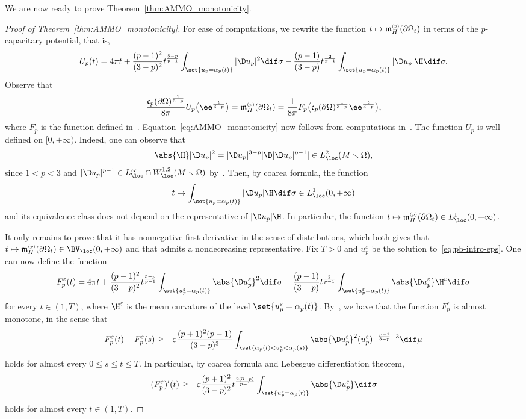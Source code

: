 \documentclass[10pt,a4paper]{amsart}
\numberwithin{equation}{section}
\renewcommand{\ncapa}{\mathfrak{c}}
\newcommand{\ma}{\mathfrak{m}}
\newcommand{\tp}[1][p]{{\text{\tiny$(#1)$}}}
\begin{document}
We are now ready to prove Theorem~\ref{thm:AMMO_monotonicity}.

\begin{proof}[Proof of Theorem~\ref{thm:AMMO_monotonicity}] For ease of computations, we rewrite the function $t\mapsto \ma_{H}^{\tp}(\partial \Omega_t)$ in terms of the $p$-capacitary potential, that is,
\[
 U_p(t)= 4 \pi t + \frac{(p-1)^2}{(3-p)^2} t^{\frac{5-p}{p-1}} \int_{\set{u_p = \alpha_p(t)}} | \D u_p |^2 \dif \sigma -\frac{(p-1)}{(3-p)} t^{\frac{2}{p-1}} \int_{\set{u_p = \alpha_p(t)}} | \D u_p |\H \dif \sigma.
\]
Observe that
\[
 \frac{\ncapa_p(\partial \Omega)^\frac{1}{3-p}}{8\pi} U_p\big(\ee^{\frac{t}{3-p}}\big) = \ma_{H}^{\tp}(\partial \Omega_t)= \frac{1}{8\pi}F_p\big(\ncapa_p(\partial \Omega)^\frac{1}{3-p} \ee^{\frac{t}{3-p}}\big),
\]
where $F_p$ is the function defined in~\cite{agostiniani_riemannianpenroseinequalitynonlinear_2022}. Equation~\eqref{eq:AMMO_monotonicity} now follows from computations in~\cite[Section 1.2]{agostiniani_riemannianpenroseinequalitynonlinear_2022}. The function $U_p$ is well defined on $[0,+\infty)$. Indeed, one can observe that
\[
 \abs{ \H} | \D u_p |^2 = | \D u_p |^{3-p} | \D | \D u_p |^{p-1}| \in L^2_{\loc}(M\smallsetminus \Omega),
\]
since $1<p<3$ and $| \D u_p |^{p-1} \in L^\infty_{\loc}\cap W^{1,2}_{\loc} (M\smallsetminus \Omega)$ by~\cite[Lemma~2.1]{lou_singularsetslocalsolutions_2008}. Then, by coarea formula, the function
\[
 t \mapsto \int_{\set{u_p= \alpha_p(t)}} | \D u_p | \H \dif \sigma\in L^1_{\loc}(0,+\infty)
\]
and its equivalence class does not depend on the representative of $| \D u_p | \H $. In particular, the function $t\mapsto \ma_{H}^{\tp}(\partial \Omega_t) \in L^1_{\loc}(0,+\infty)$.

It only remains to prove that it has nonnegative first derivative in the sense of distributions, which both gives that $t\mapsto \ma_{H}^{\tp}(\partial \Omega_t) \in \BV_{\loc}(0,+\infty)$ and that admits a nondecreasing representative. Fix $T>0$ and $u^\varepsilon_p$ be the solution to~\eqref{eq:pb-intro-eps}. One can now define the function
\[
 F_p^\varepsilon(t)= 4 \pi t + \frac{(p-1)^2}{(3-p)^2} t^{\frac{5-p}{p-1}} \int_{\set{u^\varepsilon_p = \alpha_p(t)}} \abs{ \D u^\varepsilon_p}^2 \dif \sigma -\frac{(p-1)}{(3-p)} t^{\frac{2}{p-1}} \int_{\set{u^\varepsilon_p = \alpha_p(t)}} \abs{ \D u^\varepsilon_p}\H^\varepsilon\dif \sigma
\]
for every $t \in (1,T)$, where $\H^\varepsilon$ is the mean curvature of the level $\set{u^\varepsilon_p = \alpha_p(t)}$. By~\cite[Lemma~1.2]{agostiniani_riemannianpenroseinequalitynonlinear_2022}, we have that the function $F^\varepsilon_p$ is almost monotone, in the sense that
\[
 F^\varepsilon_p(t)- F^\varepsilon_p(s) \geq -\varepsilon
 \frac{(p+1)^2(p-1)}{(3-p)^3} \int_{ \set{\alpha_p(t) < u^\varepsilon_p<\alpha_p(s)}}\abs{ \D u_p^\varepsilon}^2(u^\varepsilon_p)^{-\frac{p-1}{3-p}-3} \dif \mu
\]
holds for almost every $0\leq s\leq t \leq T$.
In particular, by coarea formula and Lebesgue differentiation theorem,
\[
 (F^\varepsilon_p)'(t) \geq
 - \varepsilon \frac{(p+1)^2}{(3-p)^2}t^{\frac{2(3-p)}{p-1}} \int_{\set{u^\varepsilon_p=\alpha_p(t)}} \abs{ \D u^\varepsilon_p} \dif \sigma
\]
holds for almost every $t \in (1,T)$.


\end{proof}
\end{document}
